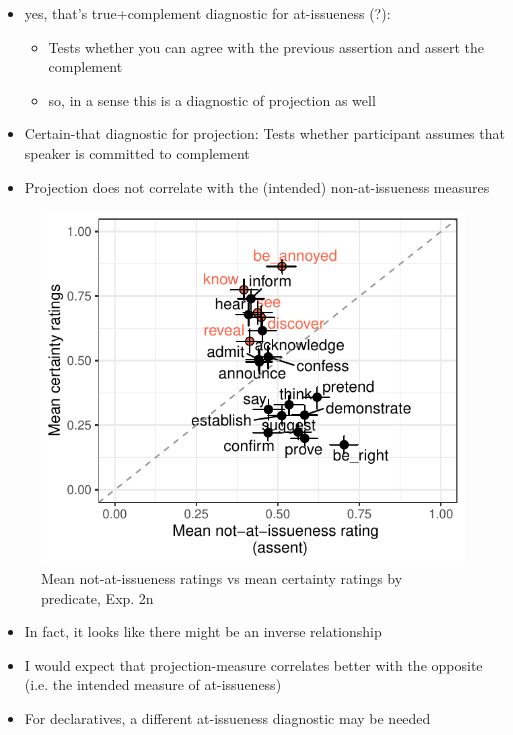 \documentclass[11pt]{article}
\begin{document}
			\begin{itemize}
				
				\item yes, that's true+complement diagnostic for at-issueness (?):
				\begin{itemize}
					\item Tests whether you can agree with the previous assertion and assert the complement
					\item so, in a sense this is a diagnostic of projection as well
				\end{itemize}
				

				\item Certain-that diagnostic for projection: Tests whether participant assumes that speaker is committed to complement

				\item Projection does not correlate with the (intended) non-at-issueness measures
			\end{itemize}

			\begin{figure}[h]
				\centering
				\includegraphics[]{figures/n2-correl.pdf}
				\caption{Mean not-at-issueness ratings vs mean certainty ratings by predicate, Exp. 2n}
				\label{fig:figure1}
			\end{figure}

			\begin{itemize}
				\item In fact, it looks like there might be an inverse relationship
				\item I would expect that projection-measure correlates better with the opposite (i.e. the intended measure of at-issueness)
				\item For declaratives, a different at-issueness diagnostic may be needed
				
			\end{itemize}
\end{document}
